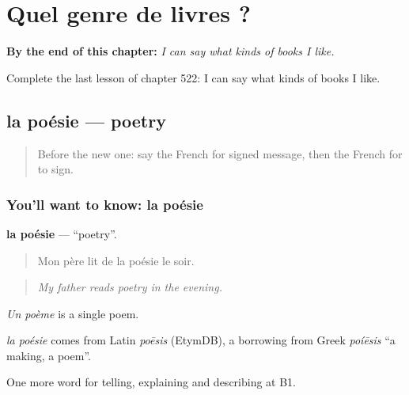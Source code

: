 
\chapter{Quel genre de livres ?}
\label{ch:fr-quel-genre-de-livres}

\begin{chapteropening}
\textbf{By the end of this chapter:} \emph{I can say what kinds of books I like.}

Complete the last lesson of chapter 522: I can say what kinds of books I like.
\end{chapteropening}

\section[la poésie]{la poésie — poetry}

\label{lesson:FR-C522-poesie}



\begin{quote}
Before the new one: say the French for signed message, then the French for to sign.
\end{quote}

\subsection*{You'll want to know: la poésie}
\textbf{la poésie} — \textquotedblleft{}poetry\textquotedblright{}.

\begin{quote}
Mon père lit de la poésie le soir.
\end{quote}

\begin{quote}
\emph{My father reads poetry in the evening.}
\end{quote}

\emph{Un poème} is a single poem.

\begin{cousinweb}
\emph{la poésie} comes from Latin \emph{poēsis} (EtymDB), a borrowing from Greek \emph{poíēsis} \textquotedblleft{}a making, a poem\textquotedblright{}.
\end{cousinweb}

\begin{grammarlens}[title={What you've built}]
One more word for telling, explaining and describing at B1.
\end{grammarlens}

